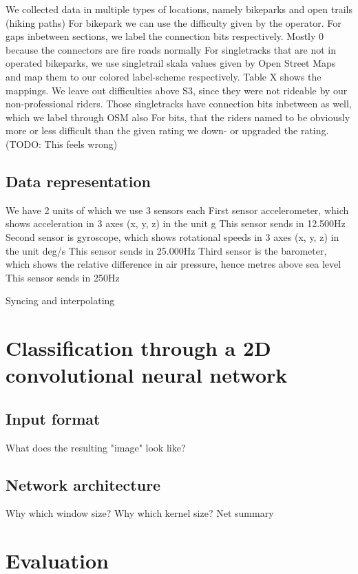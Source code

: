 \documentclass[runningheads]{llncs}
\begin{document}
We collected data in multiple types of locations, namely bikeparks and open trails (hiking paths)
For bikepark we can use the difficulty given by the operator. 
For gaps inbetween sections, we label the connection bits respectively.
Mostly 0 because the connectors are fire roads normally
For singletracks that are not in operated bikeparks, we use singletrail skala values given by Open Street Maps and map them to our colored label-scheme respectively.
Table X shows the mappings. We leave out difficulties above S3, since they were not rideable by our non-professional riders. 
Those singletracks have connection bits inbetween as well, which we label through OSM also
For bits, that the riders named to be obviously more or less difficult than the given rating we down- or upgraded the rating. (TODO: This feels wrong)

\subsection{Data representation}
We have 2 units of which we use 3 sensors each
First sensor accelerometer, which shows acceleration in 3 axes (x, y, z) in the unit g
This sensor sends in 12.500Hz
Second sensor is gyroscope, which shows rotational speeds in 3 axes (x, y, z) in the unit deg/s
This sensor sends in 25.000Hz
Third sensor is the barometer, which shows the relative difference in air pressure, hence metres above sea level
This sensor sends in 250Hz

Syncing and interpolating



\section{Classification through a 2D convolutional neural network}


\subsection{Input format}
What does the resulting "image" look like?

\subsection{Network architecture}
Why which window size?
Why which kernel size?
Net summary


\section{Evaluation}
\end{document}
